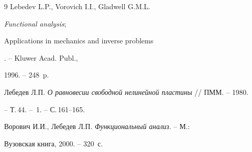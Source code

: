 \begin{thebibliography}{9}
Lebedev L.P., Vorovich I.I., Gladwell G.M.L. {\em Functional analysis$;$


Applications in mechanics and inverse problems}. -- Kluwer Acad. Publ.,


1996. -- 248~p.







Лебедев Л.П. {\em О равновесии свободной нелинейной пластины} // ПММ. -- 1980.


-- Т.\,44. -- \No\,1. -- С.\,161--165.







Ворович И.И., Лебедев Л.П. {\em Функциональный анализ}. -- М.: 


Вузовская книга, 2000. -- 320~с.





\end{thebibliography}





\vskip 2cm












\label{end}





